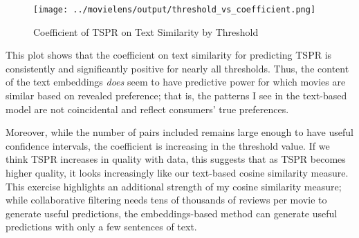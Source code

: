 \documentclass{article}
\begin{document}
\begin{figure}
    \begin{center}
    \texttt{[image: ../movielens/output/threshold\_vs\_coefficient.png]}
    \caption{Coefficient of TSPR on Text Similarity by Threshold}
    \label{fig:tspr_threshold}
    \end{center}
\end{figure}

This plot shows that the coefficient on text similarity for predicting TSPR is consistently and significantly positive for nearly all thresholds. Thus, the content of the text embeddings \emph{does} seem to have predictive power for which movies are similar based on revealed preference; that is, the patterns I see in the text-based model are not coincidental and reflect consumers' true preferences. 

Moreover, while the number of pairs included remains large enough to have useful confidence intervals, the coefficient is increasing in the threshold value. If we think TSPR increases in quality with data, this suggests that as TSPR becomes higher quality, it looks increasingly like our text-based cosine similarity measure. This exercise highlights an additional strength of my cosine similarity measure; while collaborative filtering needs tens of thousands of reviews per movie to generate useful predictions, the embeddings-based method can generate useful predictions with only a few sentences of text.



\end{document}
